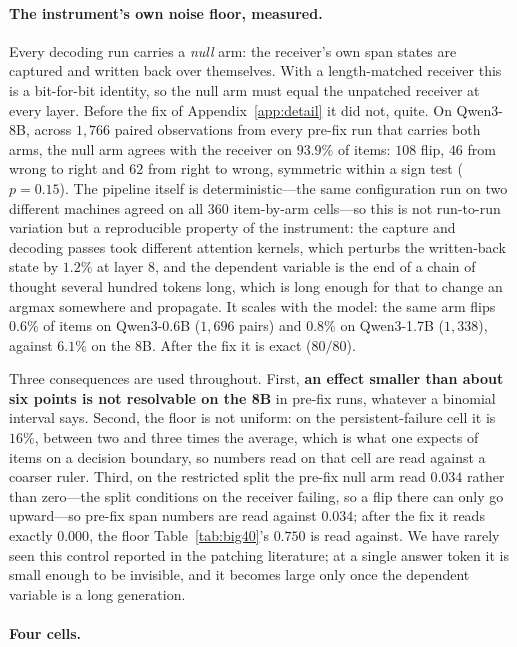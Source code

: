 \documentclass{article}
\begin{document}
\paragraph{The instrument's own noise floor, measured.} Every decoding run
carries a \emph{null} arm: the receiver's own span states are captured and
written back over themselves. With a length-matched receiver this is a
bit-for-bit identity, so the null arm must equal the unpatched receiver at every
layer. Before the fix of Appendix~\ref{app:detail} it did not, quite. On
Qwen3-8B, across $1{,}766$ paired observations from every pre-fix run that
carries both arms, the null arm agrees with the receiver on $93.9\%$ of items:
$108$ flip, $46$ from wrong to right and $62$ from right to wrong, symmetric
within a sign test ($p = 0.15$). The pipeline itself is
deterministic---the same configuration run on two different machines agreed on
all $360$ item-by-arm cells---so this is not run-to-run variation but a
reproducible property of the instrument: the capture and decoding passes took
different attention kernels, which perturbs the written-back state by $1.2\%$ at
layer 8, and the dependent variable is the end of a chain of thought several
hundred tokens long, which is long enough for that to change an argmax somewhere
and propagate. It scales with the model: the same arm flips $0.6\%$ of items on
Qwen3-0.6B ($1{,}696$ pairs) and $0.8\%$ on Qwen3-1.7B ($1{,}338$), against
$6.1\%$ on the 8B. After the fix it is exact ($80/80$).

Three consequences are used throughout. First, \textbf{an effect smaller than
about six points is not resolvable on the 8B} in pre-fix runs, whatever a
binomial interval says. Second, the floor is not uniform: on the
persistent-failure cell it is $16\%$, between two and three times the average,
which is what one expects of items on a
decision boundary, so numbers read on that cell are read against a coarser
ruler. Third, on the restricted split the pre-fix null arm read $0.034$ rather than
zero---the split conditions on the receiver failing, so a flip there can only go
upward---so pre-fix span numbers are read against $0.034$; after the fix it reads
exactly $0.000$, the floor Table~\ref{tab:big40}'s $0.750$ is read against. We have rarely seen this control reported in the patching literature; at a single answer token it is small enough to be invisible, and it
becomes large only once the dependent variable is a long generation.

\paragraph{Four cells.}
\end{document}
